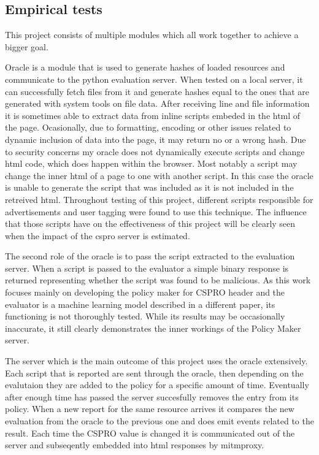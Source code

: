 \begin{description}
\subsection{Empirical tests}

This project consists of multiple modules which all work together to achieve a bigger goal.

Oracle is a module that is used to generate hashes of loaded resources and communicate to the python evaluation server.
When tested on a local server, it can successfully fetch files from it and generate hashes equal to the ones that are generated with system tools on file data.
After receiving line and file information it is sometimes able to extract data from inline scripts embeded in the html of the page.
Ocasionally, due to formatting, encoding or other issues related to dynamic inclusion of data into the page, it may return no or a wrong hash.
Due to security concerns my oracle does not dynamically execute scripts and change html code, which does happen within the browser.
Most notably a script may change the inner html of a page to one with another script.
In this case the oracle is unable to generate the script that was included as it is not included in the retreived html.
Throughout testing of this project, different scripts responsible for advertisements and user tagging were found to use this technique.
The influence that those scripts have on the effectiveness of this project will be clearly seen when the impact of the cspro server is estimated.

The second role of the oracle is to pass the script extracted to the evaluation server.
When a script is passed to the evaluator a simple binary response is returned representing whether the script was found to be malicious.
As this work focuses mainly on developing the policy maker for CSPRO header and the evaluator is a machine learning model described in a different paper, its functioning is not thoroughly tested.
While its results may be occasionally inaccurate, it still clearly demonstrates the inner workings of the Policy Maker server.

The server which is the main outcome of this project uses the oracle extensively.
Each script that is reported are sent through the oracle, then depending on the evalutaion they are added to the policy for a specific amount of time.
Eventually after enough time has passed the server succesfully removes the entry from its policy.
When a new report for the same resource arrives it compares the new evaluation from the oracle to the previous one and does emit events related to the result.
Each time the CSPRO value is changed it is communicated out of the server and subseqently embedded into html responses by mitmproxy.


\end{description}
